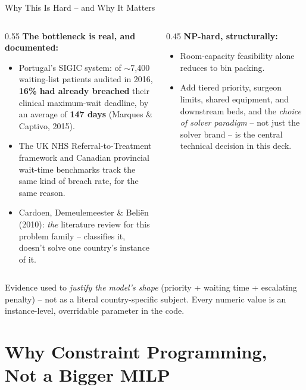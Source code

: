 \documentclass[aspectratio=169]{beamer}
\begin{document}
\begin{frame}{Why This Is Hard -- and Why It Matters}
  \begin{columns}[T]
    \begin{column}{0.55\textwidth}
      \textbf{The bottleneck is real, and documented:}
      \begin{itemize}
        \item Portugal's SIGIC system: of $\sim$7{,}400 waiting-list patients audited in
          2016, \textbf{16\% had already breached} their clinical maximum-wait deadline,
          by an average of \textbf{147 days} (Marques \& Captivo, 2015).
        \item The UK NHS Referral-to-Treatment framework and Canadian provincial
          wait-time benchmarks track the same kind of breach rate, for the same reason.
        \item Cardoen, Demeulemeester \& Beli\"en (2010): \emph{the} literature review
          for this problem family -- classifies it, doesn't solve one country's
          instance of it.
      \end{itemize}
    \end{column}
    \begin{column}{0.45\textwidth}
      \textbf{NP-hard, structurally:}
      \begin{itemize}
        \item Room-capacity feasibility alone reduces to bin packing.
        \item Add tiered priority, surgeon limits, shared equipment, and downstream
          beds, and the \emph{choice of solver paradigm} -- not just the solver
          brand -- is the central technical decision in this deck.
      \end{itemize}
    \end{column}
  \end{columns}
  \vfill
  \footnotesize Evidence used to \emph{justify the model's shape} (priority + waiting
  time + escalating penalty) -- not as a literal country-specific subject. Every
  numeric value is an instance-level, overridable parameter in the code.
\end{frame}

\section{Why Constraint Programming, Not a Bigger MILP}
\end{document}
